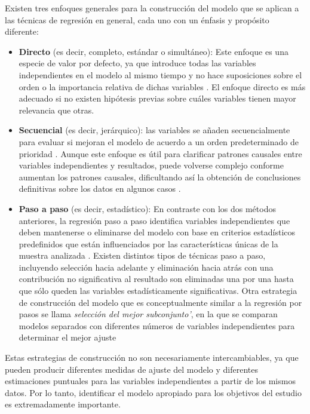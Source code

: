 \documentclass[12pt]{article}
\begin{document}
Existen tres enfoques generales para la construcci\'on del modelo que se aplican a las t\'ecnicas de regresi\'on en general, cada uno con un \'enfasis y prop\'osito diferente: 
\begin{itemize}
\item \textbf{Directo} (es decir, completo, est\'andar o simult\'aneo): Este enfoque es una especie de valor por defecto, ya que introduce todas las variables independientes en el modelo al mismo tiempo y no hace suposiciones sobre el orden o la importancia relativa de dichas variables \cite{darlington1990,tabachnick2007}. El enfoque directo es m\'as adecuado si no existen hip\'otesis previas sobre cu\'ales variables tienen mayor relevancia que otras. 

\item \textbf{Secuencial} (es decir, jer\'arquico):  las variables se a\~naden secuencialmente para evaluar si mejoran el modelo de acuerdo a un orden predeterminado de prioridad \cite{darlington1990,tabachnick2007}. Aunque este enfoque es \'util para clarificar patrones causales entre variables independientes y resultados, puede volverse complejo conforme aumentan los patrones causales, dificultando as\'i la obtenci\'on de conclusiones definitivas sobre los datos en algunos casos \cite{darlington1990}.

\item \textbf{Paso a paso} (es decir, estad\'istico): En contraste con los dos m\'etodos anteriores, la regresi\'on paso a paso identifica variables independientes que deben mantenerse o eliminarse del modelo con base en criterios estad\'isticos predefinidos que est\'an influenciados por las caracter\'isticas \'unicas de la muestra analizada \cite{tabachnick2007,hosmer2000}. Existen distintos tipos de t\'ecnicas paso a paso, incluyendo selecci\'on hacia adelante y eliminaci\'on hacia atr\'as con una contribuci\'on no significativa al resultado son eliminadas una por una hasta que s\'olo queden las variables estad\'isticamente significativas.\cite{darlington1990, hosmer2000} Otra estrategia de construcci\'on del modelo que es conceptualmente similar a la regresi\'on por pasos se llama \textit{selecci\'on del mejor subconjunto'}, en la que se comparan modelos separados con diferentes n\'umeros de variables independientes para determinar el mejor ajuste \cite{hosmer2000}
\end{itemize}

Estas estrategias de construcci\'on no son necesariamente intercambiables, ya que pueden producir diferentes medidas de ajuste del modelo y diferentes estimaciones puntuales para las variables independientes a partir de los mismos datos. Por lo tanto, identificar el modelo apropiado para los objetivos del estudio es extremadamente importante.
\end{document}
